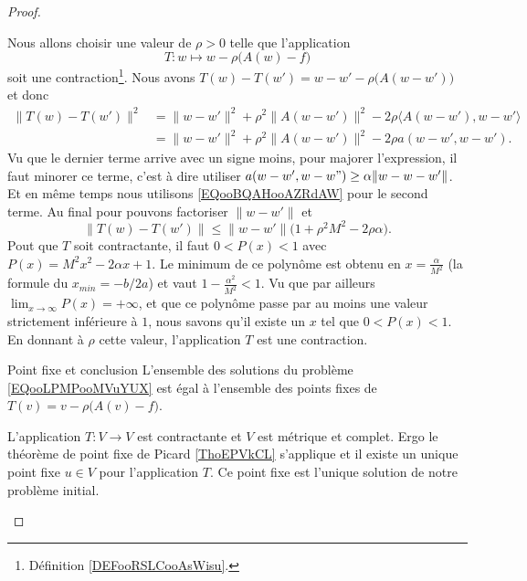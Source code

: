 \begin{proof}
\begin{subproof}
                Nous allons choisir une valeur de \( \rho>0\) telle que l'application
                \begin{equation}
                    T\colon w\mapsto w-\rho\big( A(w)-f \big)
                \end{equation}
                soit une contraction\footnote{Définition \ref{DEFooRSLCooAsWisu}.}. Nous avons \( T(w)-T(w')=w-w'-\rho\big( A(w-w') \big)\) et donc
                \begin{subequations}
                    \begin{align}
                        \| T(w)-T(w') \|^2&=\| w-w' \|^2+\rho^2\| A(w-w') \|^2-2\rho\langle A(w-w'), w-w'\rangle \\
                        &=\| w-w' \|^2+\rho^2\| A(w-w') \|^2-2\rho a(w-w',w-w').
                    \end{align}
                \end{subequations}
                Vu que le dernier terme arrive avec un signe moins, pour majorer l'expression, il faut minorer ce terme, c'est à dire utiliser \( a(w-w',w-w")\geq \alpha\| w-w-w' \|\). Et en même temps nous utilisons \eqref{EQooBQAHooAZRdAW} pour le second terme. Au final pour pouvons factoriser \( \| w-w' \|\) et 
                \begin{equation}
                    \| T(w)-T(w') \|\leq \| w-w' \|\big( 1+\rho^2M^2-2\rho\alpha \big).
                \end{equation}
                Pout que \( T\) soit contractante, il faut \( 0<P(x)<1\) avec \( P(x)=M^2x^2-2\alpha x+1\). Le minimum de ce polynôme est obtenu en \( x=\frac{ \alpha }{ M^2 }\) (la formule du \( x_{min}=-b/2a\)) et vaut \( 1-\frac{ \alpha^2 }{ M^2 }<1\). Vu que par ailleurs \( \lim_{x\to \infty} P(x)=+\infty\), et que ce polynôme passe par au moins une valeur strictement inférieure à \( 1\), nous savons qu'il existe un \( x\) tel que \( 0<P(x)<1\). En donnant à \( \rho\) cette valeur, l'application \( T\) est une contraction.

            \item[Point fixe et conclusion]
                L'ensemble des solutions du problème \eqref{EQooLPMPooMVuYUX} est égal à l'ensemble des points fixes de \( T(v)=v-\rho\big( A(v)-f \big)\).

                L'application \( T\colon V\to V\) est contractante et \( V\) est métrique et complet. Ergo le théorème de point fixe de Picard \ref{ThoEPVkCL} s'applique et il existe un unique point fixe \( u\in V\) pour l'application \( T\). Ce point fixe est l'unique solution de notre problème initial.


\end{subproof}
\end{proof}
